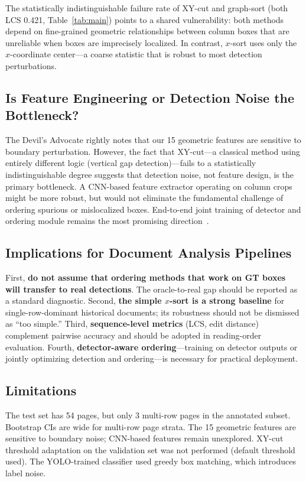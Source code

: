\documentclass[5p,times,twocolumn]{elsarticle}
\begin{document}
The statistically indistinguishable failure rate of XY-cut and graph-sort (both LCS 0.421, Table~\ref{tab:main}) points to a shared vulnerability: both methods depend on fine-grained geometric relationships between column boxes that are unreliable when boxes are imprecisely localized. In contrast, $x$-sort uses only the $x$-coordinate center---a coarse statistic that is robust to most detection perturbations.

\subsection{Is Feature Engineering or Detection Noise the Bottleneck?}
The Devil's Advocate rightly notes that our 15 geometric features are sensitive to boundary perturbation. However, the fact that XY-cut---a classical method using entirely different logic (vertical gap detection)---fails to a statistically indistinguishable degree suggests that detection noise, not feature design, is the primary bottleneck. A CNN-based feature extractor operating on column crops might be more robust, but would not eliminate the fundamental challenge of ordering spurious or mislocalized boxes. End-to-end joint training of detector and ordering module remains the most promising direction~\cite{liu2022layoutreader}.

\subsection{Implications for Document Analysis Pipelines}
First, \textbf{do not assume that ordering methods that work on GT boxes will transfer to real detections}. The oracle-to-real gap should be reported as a standard diagnostic. Second, \textbf{the simple $x$-sort is a strong baseline} for single-row-dominant historical documents; its robustness should not be dismissed as ``too simple.'' Third, \textbf{sequence-level metrics} (LCS, edit distance) complement pairwise accuracy and should be adopted in reading-order evaluation. Fourth, \textbf{detector-aware ordering}---training on detector outputs or jointly optimizing detection and ordering---is necessary for practical deployment.

\subsection{Limitations}
The test set has 54 pages, but only 3 multi-row pages in the annotated subset. Bootstrap CIs are wide for multi-row page strata. The 15 geometric features are sensitive to boundary noise; CNN-based features remain unexplored. XY-cut threshold adaptation on the validation set was not performed (default threshold used). The YOLO-trained classifier used greedy box matching, which introduces label noise.
\end{document}

